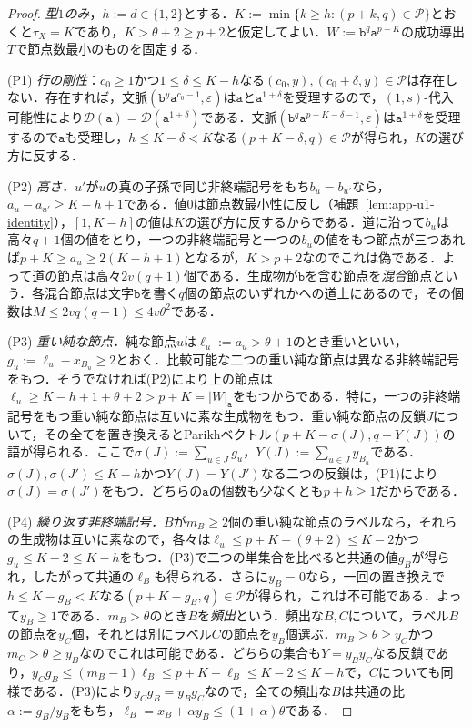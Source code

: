 \documentclass[11pt,a4paper]{ltjsarticle}
\numberwithin{equation}{section}
\theoremstyle{plain}
\theoremstyle{definition}
\theoremstyle{remark}
\newcommand{\D}{\mathcal{D}}
\newcommand{\eps}{\varepsilon}
\begin{document}
\begin{proof}
\emph{型$1$のみ}，$h:=d\in\{1,2\}$とする．$K:=\min\{k\ge h:(p+k,q)\in\mathcal P\}$とおくと$\tau_X=K$であり，$K>\theta+2\ge p+2$と仮定してよい．$W:=\mathtt b^q\mathtt a^{p+K}$の成功導出$T$で節点数最小のものを固定する．

(P1) \emph{行の剛性}：$c_0\ge1$かつ$1\le\delta\le K-h$なる$(c_0,y),(c_0+\delta,y)\in\mathcal P$は存在しない．存在すれば，文脈$(\mathtt b^y\mathtt a^{c_0-1},\eps)$は$\mathtt a$と$\mathtt a^{1+\delta}$を受理するので，$(1,s)$-代入可能性により$\D(\mathtt a)=\D(\mathtt a^{1+\delta})$である．文脈$(\mathtt b^q\mathtt a^{p+K-\delta-1},\eps)$は$\mathtt a^{1+\delta}$を受理するので$\mathtt a$も受理し，$h\le K-\delta<K$なる$(p+K-\delta,q)\in\mathcal P$が得られ，$K$の選び方に反する．

(P2) \emph{高さ．}$u'$が$u$の真の子孫で同じ非終端記号をもち$b_u=b_{u'}$なら，$a_u-a_{u'}\ge K-h+1$である．値$0$は節点数最小性に反し（補題~\ref{lem:app-u1-identity}），$[1,K-h]$の値は$K$の選び方に反するからである．道に沿って$b_u$は高々$q+1$個の値をとり，一つの非終端記号と一つの$b_u$の値をもつ節点が三つあれば$p+K\ge a_u\ge2(K-h+1)$となるが，$K>p+2$なのでこれは偽である．よって道の節点は高々$2v(q+1)$個である．生成物が$\mathtt b$を含む節点を\emph{混合}節点という．各混合節点は文字$\mathtt b$を書く$q$個の節点のいずれかへの道上にあるので，その個数は$M\le2vq(q+1)\le4v\theta^2$である．

(P3) \emph{重い純な節点．}純な節点$u$は$\ell_u:=a_u>\theta+1$のとき重いといい，$g_u:=\ell_u-x_{B_u}\ge2$とおく．比較可能な二つの重い純な節点は異なる非終端記号をもつ．そうでなければ(P2)により上の節点は$\ell_u\ge K-h+1+\theta+2>p+K=|W|_{\mathtt a}$をもつからである．特に，一つの非終端記号をもつ重い純な節点は互いに素な生成物をもつ．重い純な節点の反鎖$J$について，その全てを置き換えるとParikhベクトル$(p+K-\sigma(J),q+Y(J))$の語が得られる．ここで$\sigma(J):=\sum_{u\in J}g_u$，$Y(J):=\sum_{u\in J}y_{B_u}$である．$\sigma(J),\sigma(J')\le K-h$かつ$Y(J)=Y(J')$なる二つの反鎖は，(P1)により$\sigma(J)=\sigma(J')$をもつ．どちらの$\mathtt a$の個数も少なくとも$p+h\ge1$だからである．

(P4) \emph{繰り返す非終端記号．}$B$が$m_B\ge2$個の重い純な節点のラベルなら，それらの生成物は互いに素なので，各々は$\ell_u\le p+K-(\theta+2)\le K-2$かつ$g_u\le K-2\le K-h$をもつ．(P3)で二つの単集合を比べると共通の値$g_B$が得られ，したがって共通の$\ell_B$も得られる．さらに$y_B=0$なら，一回の置き換えで$h\le K-g_B<K$なる$(p+K-g_B,q)\in\mathcal P$が得られ，これは不可能である．よって$y_B\ge1$である．$m_B>\theta$のとき$B$を\emph{頻出}という．頻出な$B,C$について，ラベル$B$の節点を$y_C$個，それとは別にラベル$C$の節点を$y_B$個選ぶ．$m_B>\theta\ge y_C$かつ$m_C>\theta\ge y_B$なのでこれは可能である．どちらの集合も$Y=y_By_C$なる反鎖であり，$y_Cg_B\le(m_B-1)\ell_B\le p+K-\ell_B\le K-2\le K-h$で，$C$についても同様である．(P3)により$y_Cg_B=y_Bg_C$なので，全ての頻出な$B$は共通の比$\alpha:=g_B/y_B$をもち，$\ell_B=x_B+\alpha y_B\le(1+\alpha)\theta$である．


\end{proof}
\end{document}
